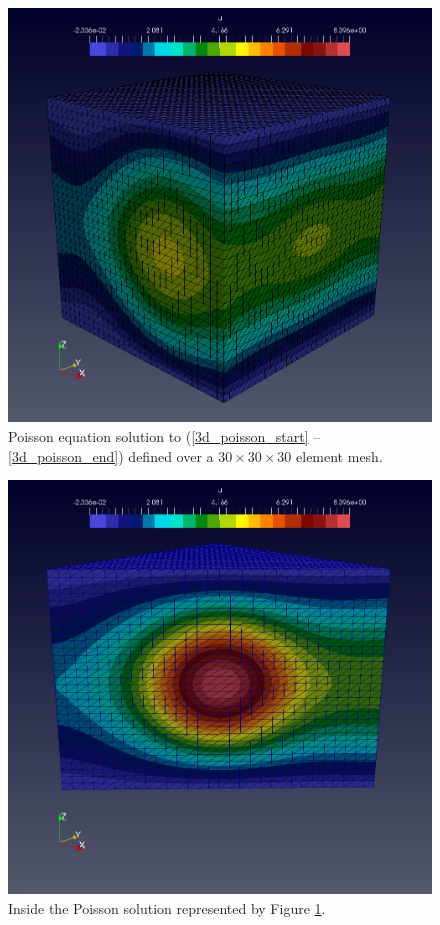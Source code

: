 \begin{figure}
  \centering
    \includegraphics[width=\linewidth]{images/fenics_intro/3Dpoisson_new.png}
  \caption[Three-dimensional Poisson solution]{Poisson equation solution to (\ref{3d_poisson_start} -- \ref{3d_poisson_end}) defined over a $30 \times 30 \times 30$ element mesh.}
  \label{3d_poisson_image_1}
\end{figure}

\begin{figure}
  \centering
    \includegraphics[width=\linewidth]{images/fenics_intro/3Dpoisson_new_split.png}
  \caption[Inside the three-dimensional Poisson solution]{Inside the Poisson solution represented by Figure \ref{3d_poisson_image_1}.}
  \label{3d_poisson_image_2}
\end{figure}

